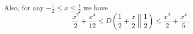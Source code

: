 Also, for any $-\frac{1}{2} \leq x\leq \frac{1}{2}$ we have
\[
\frac{x^2}{2} +\frac{x^4}{12}\leq D\left(\frac{1}{2}+\frac{x}{2}\middle\|\frac{1}{2}\right) \leq \frac{x^2}{2} + \frac{x^4}{5}.
\]

% 

